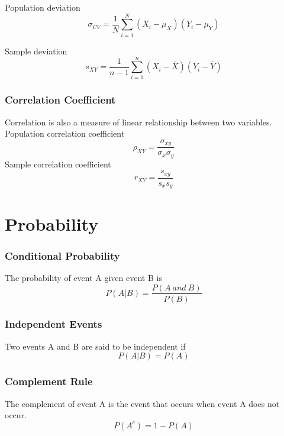\documentclass{article}
\begin{document}
Population deviation
\begin{equation}
\sigma_{CV} = \frac{1}{N}\displaystyle\sum_{i=1}^{N}(X_i - \mu_X)(Y_i - \mu_Y)
\end{equation}

Sample deviation
\begin{equation}
s_{XY} = \frac{1}{n-1}\displaystyle\sum_{i=1}^{n}(X_i - \bar{X})(Y_i - \bar{Y})
\end{equation}

\subsubsection{Correlation Coefficient}
Correlation is also a measure of linear relationship between two variables.
\\

Population correlation coefficient
\begin{equation}
\rho_{XY} = \frac{\sigma_{xy}}{\sigma_x \sigma_y}
\end{equation}
Sample correlation coefficient
\begin{equation}
r_{XY} = \frac{s_{xy}}{s_x s_y}
\end{equation}


\pagebreak
\section{Probability}

\subsubsection{Conditional Probability}
The probability of event A given event B is
\begin{equation}
P(A|B) = \frac{P(A\:and\:B)}{P(B)}
\end{equation}

\subsubsection{Independent Events}
Two events A and B are said to be independent if
\begin{equation}
P(A|B) = P(A)
\end{equation}

\subsubsection{Complement Rule}
The complement of event A is the event that occurs when event A does not occur.
\begin{equation}
P(A^c) = 1 - P(A)
\end{equation}
\end{document}
